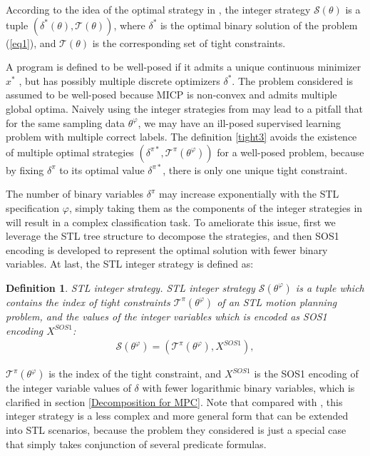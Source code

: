 \documentclass[a4paper]{report}
\newtheorem{myDef}{Definition}
\begin{document}
According to the idea of the optimal strategy in \cite{bertsimas2022online},  the integer strategy $\mathcal{S}(\theta)$ is a tuple $(\delta^*(\theta),\mathcal{T}(\theta))$, where $\delta^*$ is the optimal binary solution of the problem (\ref*{eq1}), and $\mathcal{T}(\theta)$ is the corresponding set of tight constraints.

A program is defined to be well-posed if it admits a unique continuous minimizer $x^*$ \cite{Cauligi2020}\cite{jaynes1973well}, but has possibly multiple discrete optimizers ${\delta^*}$. The problem considered is assumed to be well-posed because MICP is non-convex and admits multiple global optima. Naively using the integer strategies from \cite{bertsimas2022online}\cite{bertsimas2021voice} may lead to a pitfall that for the same sampling data $\theta^\varphi$, we may have an ill-posed supervised learning problem with multiple correct labels. The definition \ref{tight3} avoids the existence of multiple optimal strategies ${(\delta^{\pi*},\mathcal{T}^\pi(\theta^\varphi))}$ for a well-posed problem, because by fixing $\delta^\pi$ to its optimal value $\delta^{\pi*}$, there is only one unique tight constraint.

The number of binary variables $\delta^\pi$ may increase exponentially with the STL specification $\varphi$, simply taking them as the components of the integer strategies in \cite{Cauligi2020} will result in a complex classification task. To ameliorate this issue, first we leverage the STL tree structure to decompose the strategies, and then SOS1 encoding is developed to represent the optimal solution with fewer binary variables. At last, the STL integer strategy is defined as:
\begin{myDef}
    STL integer strategy. STL integer strategy $\mathcal{S}(\theta^\varphi)$ is a tuple which contains the index of tight constraints $\mathcal{T}^\pi(\theta^\varphi)$ of an STL motion planning problem, and the values of the integer variables which is encoded as SOS1 encoding $X^{SOS1}$:
    \begin{equation}
        \label{integer strategy}
        \begin{aligned}
            \mathcal{S}(\theta^\varphi) =(\mathcal{T}^\pi(\theta^\varphi), X^{SOS1}), 
        \end{aligned}
    \end{equation}
\end{myDef}
$\mathcal{T}^\pi(\theta^\varphi)$ is the index of the tight constraint, and $X^{SOS1}$ is the SOS1 encoding of the integer variable values of $\delta$ with fewer logarithmic binary variables, which is clarified in section \ref{Decomposition for MPC}. Note that compared with \cite{bertsimas2022online}\cite{Cauligi2020}\cite{bertsimas2021voice}, this integer strategy is a less complex and more general form that can be extended into STL scenarios, because the problem they considered is just a special case that simply takes conjunction of several predicate formulas.
\end{document}
